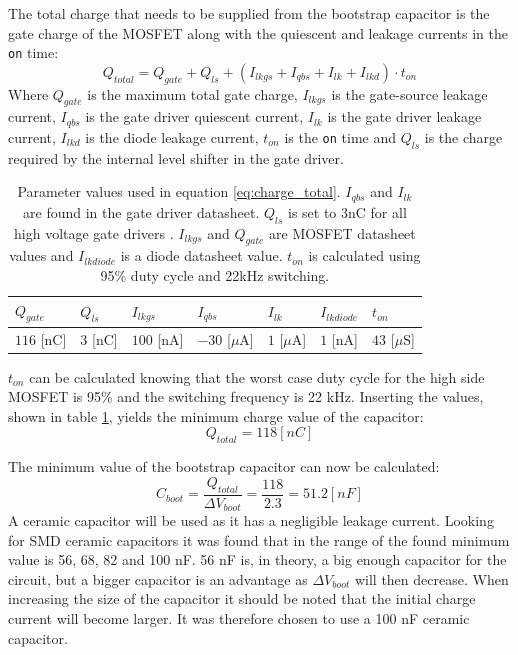 The total charge that needs to be supplied from the bootstrap capacitor is the gate charge of the MOSFET along with the quiescent and leakage currents in the \texttt{on} time:
\begin{equation}
	Q_{total} = Q_{gate} + Q_{ls} + (I_{lkgs} + I_{qbs} + I_{lk} + I_{lkd}) \cdot t_{on}
	\label{eq:charge_total}
\end{equation}
Where $Q_{gate}$ is the maximum total gate charge, $I_{lkgs}$ is the gate-source leakage current, $I_{qbs}$ is the gate driver quiescent current, $I_{lk}$ is the gate driver leakage current, $I_{lkd}$ is the diode leakage current, $ t_{on}$ is the \texttt{on} time and $Q_{ls}$ is the charge required by the internal level shifter in the gate driver.
\begin{table}[h]
\centering
\begin{tabular}{|l|l|l|l|l|l|l|}
 \hline
 $Q_{gate}$ 	& $Q_{ls}$ 	& $I_{lkgs}$ 	& $I_{qbs}$ 		& $I_{lk}$ 			& $I_{lkdiode}$ 	& $t_{on}$ 		\\ 	\hline
 $116$ [nC]		& $3$ [nC]	& $100$ [nA]	&$-30$ [$\mu$A]		& $1$ [$\mu$A]		& $1$ [nA]			& $43$ [$\mu$S]	\\ 	\hline
\end{tabular}
\caption[Parameter values used to determine total charge.]{Parameter values used in equation \ref{eq:charge_total}. $I_{qbs}$ and $I_{lk}$ are found in the gate driver datasheet. $Q_{ls}$ is set to 3nC for all high voltage gate drivers \cite{bootstrap_ON}. $I_{lkgs}$ and $Q_{gate}$ are MOSFET datasheet values and $I_{lkdiode}$  is a diode datasheet value. $t_{on}$ is calculated using 95\% duty cycle and 22kHz switching.}
\label{tab:bootstrap_parameter}
\end{table}
$t_{on}$ can be calculated knowing that the worst case duty cycle for the high side MOSFET is 95\% and the switching frequency is 22 kHz.
Inserting the values, shown in table \ref{tab:bootstrap_parameter}, yields the minimum charge value of the capacitor:
\begin{equation}
	Q_{total} = 118 [nC]
\end{equation}

The minimum value of the bootstrap capacitor can now be calculated:
\begin{equation}
	C_{boot} = \frac{Q_{total}}{\Delta V_{boot}} = \frac{118}{2.3} = 51.2 [nF]
\end{equation}
A ceramic capacitor will be used as it has a negligible leakage current. 
Looking for SMD ceramic capacitors it was found that in the range of the found minimum value is 56, 68, 82 and 100 nF.
56 nF is, in theory, a big enough capacitor for the circuit, but a bigger capacitor is an advantage as $\Delta V_{boot}$ will then decrease.
When increasing the size of the capacitor it should be noted that the initial charge current will become larger.
It was therefore chosen to use a 100 nF ceramic capacitor.

